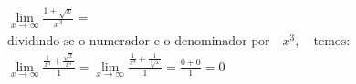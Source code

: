 \begin{ex}
\begin{align}
&\lim_{x\rightarrow \infty} \frac{1+\sqrt{x}}{x^3}=\nonumber\\
&\text{dividindo-se o numerador e o denominador por}\quad {x^3},\quad\text{temos:}\nonumber\\
&\lim_{x\rightarrow \infty} \frac{\frac{1}{x^3}+\frac{\sqrt{x}}{x^3}}{1}=\lim_{x\rightarrow \infty} \frac{\frac{1}{x^3}+\frac{1}{\sqrt[6]{x}}}{1}=\frac{0+0}{1}=0\nonumber
\end{align}
\end{ex}
